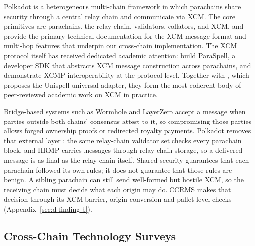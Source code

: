 Polkadot \citep{wood2016, burdgesEtAl2020} is a heterogeneous multi-chain framework in which parachains share security through a central relay chain and communicate via XCM. The core primitives are parachains, the relay chain, validators, collators, and XCM. \citet{habermeierEtAl2021} and \citet{wood2022} provide the primary technical documentation for the XCM message format and multi-hop features that underpin our cross-chain implementation. The XCM protocol itself has received dedicated academic attention: \citet{morhacEtAl2023a} build ParaSpell, a developer SDK that abstracts XCM message construction across parachains, and \citet{morhacEtAl2023b} demonstrate XCMP interoperability at the protocol level. Together with \citet{morhacEtAl2025}, which proposes the Unispell universal adapter, they form the most coherent body of peer-reviewed academic work on XCM in practice.

Bridge-based systems such as Wormhole and LayerZero accept a message when parties outside both chains' consensus attest to it, so compromising those parties allows forged ownership proofs or redirected royalty payments. Polkadot removes that external layer \citep{burdgesEtAl2020}: the same relay-chain validator set checks every parachain block, and HRMP carries messages through relay-chain storage, so a delivered message is as final as the relay chain itself. Shared security guarantees that each parachain followed its own rules; it does not guarantee that those rules are benign. A sibling parachain can still send well-formed but hostile XCM, so the receiving chain must decide what each origin may do. CCRMS makes that decision through its XCM barrier, origin conversion and pallet-level checks (Appendix~\ref{sec:d-finding-b}).

\subsection{Cross-Chain Technology Surveys}\label{subsec:cross-chain-surveys}

